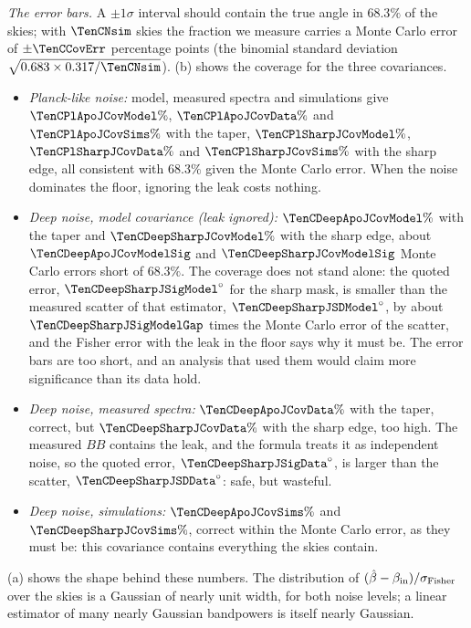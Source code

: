 \emph{The error bars.} A $\pm1\sigma$ interval should contain the true angle in $68.3\%$ of the skies; with $\TenCNsim$ skies the
fraction we measure carries a Monte Carlo error of $\pm\TenCCovErr$ percentage points (the binomial standard deviation
$\sqrt{0.683\times0.317/\TenCNsim}$). (b) shows the coverage for the three covariances.
\begin{itemize}[leftmargin=1.4em,itemsep=2pt]
  \item \emph{Planck-like noise:} model, measured spectra and simulations give $\TenCPlApoJCovModel\%$, $\TenCPlApoJCovData\%$
        and $\TenCPlApoJCovSims\%$ with the taper, $\TenCPlSharpJCovModel\%$, $\TenCPlSharpJCovData\%$ and $\TenCPlSharpJCovSims\%$ with
        the sharp edge, all consistent with $68.3\%$ given the Monte Carlo error. When the noise dominates the floor, ignoring the
        leak costs nothing.
  \item \emph{Deep noise, model covariance (leak ignored):} $\TenCDeepApoJCovModel\%$ with the taper and $\TenCDeepSharpJCovModel\%$
        with the sharp edge, about $\TenCDeepApoJCovModelSig$ and $\TenCDeepSharpJCovModelSig$ Monte Carlo errors short of $68.3\%$. The coverage does not
        stand alone: the quoted error, ${\TenCDeepSharpJSigModel}^\circ$ for the sharp mask, is smaller than the measured
        scatter of that estimator, ${\TenCDeepSharpJSDModel}^\circ$, by about $\TenCDeepSharpJSigModelGap$ times the Monte Carlo error
        of the scatter, and the Fisher error with the leak in the floor says why it must be. The error bars are too
        short, and an analysis that used them would claim more significance than its data hold.
  \item \emph{Deep noise, measured spectra:} $\TenCDeepApoJCovData\%$ with the taper, correct, but $\TenCDeepSharpJCovData\%$ with
        the sharp edge, too high. The measured $BB$ contains the leak, and the formula treats it as independent noise, so
        the quoted error, ${\TenCDeepSharpJSigData}^\circ$, is larger than the scatter, ${\TenCDeepSharpJSDData}^\circ$: safe, but
        wasteful.
  \item \emph{Deep noise, simulations:} $\TenCDeepApoJCovSims\%$ and $\TenCDeepSharpJCovSims\%$, correct within the Monte Carlo
        error, as they must be: this covariance contains everything the skies contain.
\end{itemize}
(a) shows the shape behind these numbers. The distribution of $(\hat\beta-\beta_{\rm in})/\sigma_{\rm Fisher}$ over
the skies is a Gaussian of nearly unit width, for both noise levels; a linear estimator of many nearly Gaussian
bandpowers is itself nearly Gaussian.

